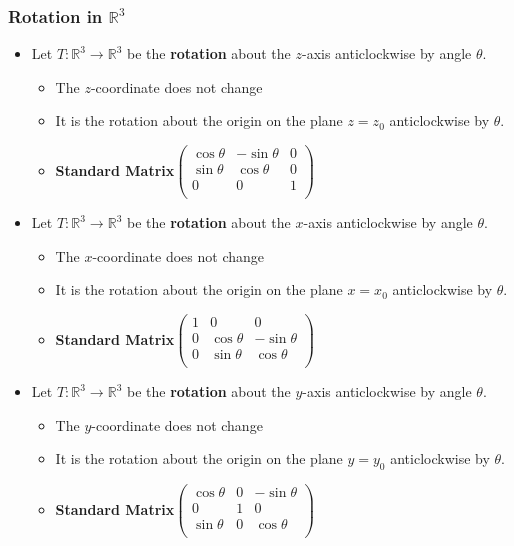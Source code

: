 \documentclass[../ma2001_notes.tex]{subfiles}
\begin{document}
\subsubsection{Rotation in $\mathbb{R}^3$}
\begin{itemize}
	\item Let \(T:\mathbb{R}^3\to\mathbb{R}^3\) be the \textbf{rotation} about the \(z\)-axis anticlockwise by angle \(\theta\).
	\begin{itemize}
		\item The \(z\)-coordinate does not change
		\item It is the rotation about the origin on the plane \(z=z_0\) anticlockwise by \(\theta\).
		\item\textbf{Standard Matrix}\(\begin{pmatrix}
			\cos\theta & -\sin\theta & 0 \\
			\sin\theta & \cos\theta & 0 \\
			0 & 0 & 1 \\
		\end{pmatrix}\)
	\end{itemize}
	\item Let \(T:\mathbb{R}^3\to\mathbb{R}^3\) be the \textbf{rotation} about the \(x\)-axis anticlockwise by angle \(\theta\).
	\begin{itemize}
		\item The \(x\)-coordinate does not change
		\item It is the rotation about the origin on the plane \(x=x_0\) anticlockwise by \(\theta\).
		\item\textbf{Standard Matrix}\(\begin{pmatrix}
			1 & 0 & 0 \\
			0 & \cos\theta & -\sin\theta \\
			0 & \sin\theta & \cos\theta \\
		\end{pmatrix}\)
	\end{itemize}
	\item Let \(T:\mathbb{R}^3\to\mathbb{R}^3\) be the \textbf{rotation} about the \(y\)-axis anticlockwise by angle \(\theta\).
	\begin{itemize}
		\item The \(y\)-coordinate does not change
		\item It is the rotation about the origin on the plane \(y=y_0\) anticlockwise by \(\theta\).
		\item\textbf{Standard Matrix}\(\begin{pmatrix}
			\cos\theta & 0 & -\sin\theta \\
			0 & 1 & 0 \\
			\sin\theta & 0 & \cos\theta \\
		\end{pmatrix}\)
	\end{itemize}
\end{itemize}
\end{document}
